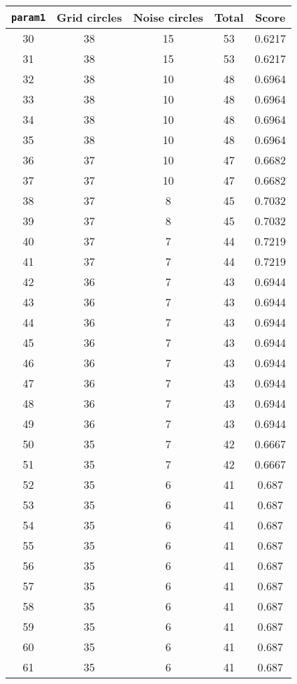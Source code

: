 \documentclass[letterpaper, 12pt]{article}
\begin{document}
\begin{longtable}{|c|c|c|c|c|}
\hline
\textbf{\texttt{param1}} & \textbf{Grid circles} & \textbf{Noise circles} & \textbf{Total} & \textbf{Score} \\
\hline
30 & 38 & 15 & 53 & 0.6217 \\
\hline
31 & 38 & 15 & 53 & 0.6217 \\
\hline
32 & 38 & 10 & 48 & 0.6964 \\
\hline
33 & 38 & 10 & 48 & 0.6964 \\
\hline
34 & 38 & 10 & 48 & 0.6964 \\
\hline
35 & 38 & 10 & 48 & 0.6964 \\
\hline
36 & 37 & 10 & 47 & 0.6682 \\
\hline
37 & 37 & 10 & 47 & 0.6682 \\
\hline
38 & 37 & 8 & 45 & 0.7032 \\
\hline
39 & 37 & 8 & 45 & 0.7032 \\
\hline
40 & 37 & 7 & 44 & 0.7219 \\
\hline
41 & 37 & 7 & 44 & 0.7219 \\
\hline
42 & 36 & 7 & 43 & 0.6944 \\
\hline
43 & 36 & 7 & 43 & 0.6944 \\
\hline
44 & 36 & 7 & 43 & 0.6944 \\
\hline
45 & 36 & 7 & 43 & 0.6944 \\
\hline
46 & 36 & 7 & 43 & 0.6944 \\
\hline
47 & 36 & 7 & 43 & 0.6944 \\
\hline
48 & 36 & 7 & 43 & 0.6944 \\
\hline
49 & 36 & 7 & 43 & 0.6944 \\
\hline
50 & 35 & 7 & 42 & 0.6667 \\
\hline
51 & 35 & 7 & 42 & 0.6667 \\
\hline
52 & 35 & 6 & 41 & 0.687 \\
\hline
53 & 35 & 6 & 41 & 0.687 \\
\hline
54 & 35 & 6 & 41 & 0.687 \\
\hline
55 & 35 & 6 & 41 & 0.687 \\
\hline
56 & 35 & 6 & 41 & 0.687 \\
\hline
57 & 35 & 6 & 41 & 0.687 \\
\hline
58 & 35 & 6 & 41 & 0.687 \\
\hline
59 & 35 & 6 & 41 & 0.687 \\
\hline
60 & 35 & 6 & 41 & 0.687 \\
\hline
61 & 35 & 6 & 41 & 0.687 \\

\end{longtable}
\end{document}
